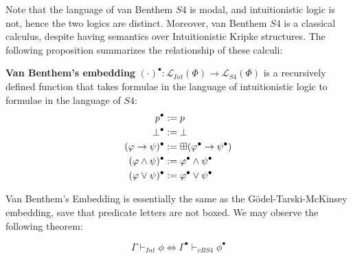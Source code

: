 Note that the language of van Benthem $S4$ is modal, and
intuitionistic logic is not, hence the two logics are distinct.
Moreover, van Benthem $S4$ is a classical calculus, despite having
semantics over Intuitionistic Kripke structures.  The following
proposition summarizes the relationship of these calculi:

\begin{definition}
\textbf{Van Benthem's embedding} $(\cdot)^\bullet :
\mathcal{L}_{Int}(\Phi) \to \mathcal{L}_{S4}(\Phi)$ is a recursively
defined function that takes formulae in the language of intuitionistic
logic to formulae in the language of $S4$: 
\begin{align*}
  p^\bullet & := p \\
  \bot^\bullet & := \bot \\
  (\varphi \to \psi)^\bullet & := \boxplus(\varphi^\bullet \to \psi^\bullet) \\
  (\varphi \wedge \psi)^\bullet & := \varphi^\bullet \wedge \psi^\bullet \\
  (\varphi \vee \psi)^\bullet & := \varphi^\bullet \vee \psi^\bullet 
\end{align*}
\end{definition}

Van Benthem's Embedding is essentially the same as the
G\"{o}del-Tarski-McKinsey embedding, save that predicate letters are
not boxed.  We may observe the following theorem:

\begin{proposition}\label{vBembedd}
\[ \Gamma \vdash_{Int} \phi \iff \Gamma^\bullet \vdash_{vBS4} \phi^\bullet \]
\end{proposition}

